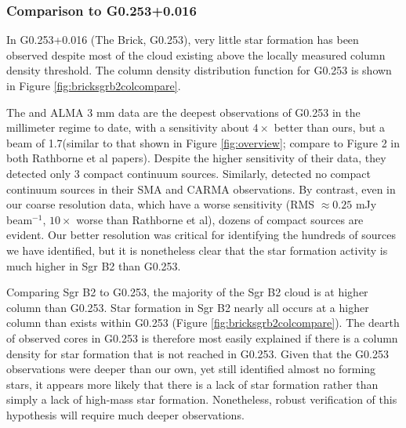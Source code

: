 \documentclass[twocolumn]{aastex61}
\begin{document}

\subsubsection{Comparison to G0.253+0.016}
In G0.253+0.016 (The Brick, G0.253), very little star formation
has been observed
\citep{Longmore2013a,Johnston2014a,Rathborne2014a,Rathborne2015a} despite most
of the cloud existing above the locally measured \citet{Lada2010a} column
density threshold.  The column density distribution function for G0.253
is shown in Figure \ref{fig:bricksgrb2colcompare}.

The \citet{Rathborne2014a} and \citet{Rathborne2015a} ALMA 3 mm data are the
deepest observations of G0.253 in the millimeter regime to date, with a
sensitivity about $4\times$ better than ours, but a beam of 1.7\arcsec (similar
to that shown in Figure \ref{fig:overview}; compare to Figure 2 in both
Rathborne et al papers).  Despite the higher sensitivity of their data,
they detected only 3 compact continuum sources.  Similarly,
\citet{Kauffmann2013a} detected no compact continuum sources in their SMA and
CARMA observations.  By contrast, even in our coarse resolution data, which
have a worse sensitivity (RMS $\approx 0.25$ mJy beam$^{-1}$, $10\times$ worse
than Rathborne et al), dozens of compact sources are evident.  Our better
resolution was critical for identifying the hundreds of sources we have
identified, but it is nonetheless clear that the star formation activity is
much higher in Sgr B2 than G0.253.


Comparing Sgr B2 to G0.253, the majority of the Sgr B2 cloud is at higher
column than G0.253.  Star formation in Sgr B2 nearly all occurs
at a higher column than exists within G0.253 (Figure
\ref{fig:bricksgrb2colcompare}).  The dearth of observed cores in G0.253 is
therefore most easily explained if there is a column density for star
formation that is not reached in G0.253.  Given that the G0.253 observations
were deeper than our own, yet still identified almost no forming stars, it
appears more likely that there is a lack of star formation rather than simply a
lack of high-mass star formation.  Nonetheless, robust verification of this
hypothesis will require much deeper observations.
\end{document}
